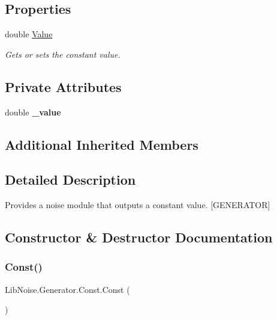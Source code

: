 \subsection*{Properties}
\begin{DoxyCompactItemize}
\item 
double \hyperlink{class_lib_noise_1_1_generator_1_1_const_a84981b674d9f9ff27a4d70ceb71f0e13}{Value}
\begin{DoxyCompactList}\small\item\em Gets or sets the constant value. \end{DoxyCompactList}\end{DoxyCompactItemize}
\subsection*{Private Attributes}
\begin{DoxyCompactItemize}
\item 
\mbox{\label{class_lib_noise_1_1_generator_1_1_const_a528ec2878a9889699659b780bed9182c}} 
double {\bfseries \+\_\+value}
\end{DoxyCompactItemize}
\subsection*{Additional Inherited Members}


\subsection{Detailed Description}
Provides a noise module that outputs a constant value. \mbox{[}G\+E\+N\+E\+R\+A\+T\+OR\mbox{]} 



\subsection{Constructor \& Destructor Documentation}
\mbox{\label{class_lib_noise_1_1_generator_1_1_const_af8fc795830be88e69bdbbd3b4546c6be}} 
\subsubsection{\texorpdfstring{Const()}{Const()}\hspace{0.1cm}{\footnotesize\ttfamily [1/2]}}
{\footnotesize\ttfamily Lib\+Noise.\+Generator.\+Const.\+Const (\begin{DoxyParamCaption}{ }\end{DoxyParamCaption})}




